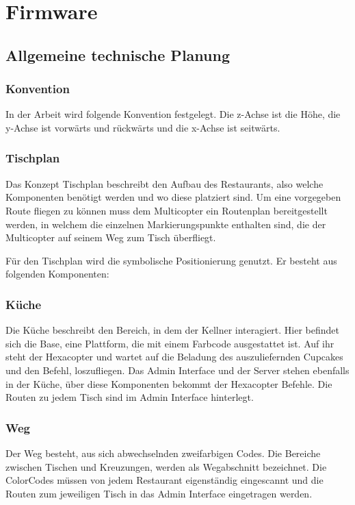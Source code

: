 \chapter{Firmware}
\renewcommand{\kapitelautor}{Autor: Christina Bornberg, Lucas Ullrich}

\section{Allgemeine technische Planung}

  \subsection{Konvention}
  In der Arbeit wird folgende Konvention festgelegt. Die z-Achse ist die Höhe, die y-Achse ist vorwärts und rückwärts und die x-Achse ist seitwärts.


  \subsection{Tischplan}
  Das Konzept Tischplan beschreibt den Aufbau des Restaurants, also welche Komponenten benötigt werden und wo diese platziert sind.
  Um eine vorgegeben Route fliegen zu können muss dem Multicopter ein Routenplan bereitgestellt werden, in welchem die einzelnen Markierungspunkte enthalten sind, die der Multicopter auf seinem Weg zum Tisch überfliegt.

  Für den Tischplan wird die symbolische Positionierung genutzt. Er besteht aus folgenden Komponenten:

  \subsection*{Küche}
  Die Küche beschreibt den Bereich, in dem der Kellner interagiert. Hier befindet sich die Base, eine Plattform, die mit einem Farbcode ausgestattet ist. Auf ihr steht der Hexacopter und wartet auf die Beladung des auszuliefernden Cupcakes und den Befehl, loszufliegen.
  Das Admin Interface und der Server stehen ebenfalls in der Küche, über diese Komponenten bekommt der Hexacopter Befehle. Die Routen zu jedem Tisch sind im Admin Interface hinterlegt.

  \subsection*{Weg}
  Der Weg besteht, aus sich abwechselnden zweifarbigen Codes. Die Bereiche zwischen Tischen und Kreuzungen, werden als Wegabschnitt bezeichnet. Die ColorCodes müssen von jedem Restaurant eigenständig eingescannt und die Routen zum jeweiligen Tisch in das Admin Interface eingetragen werden.

